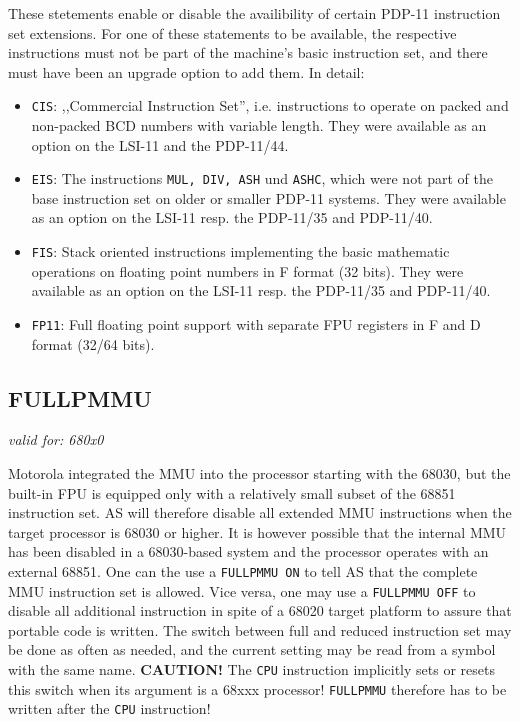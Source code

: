 \documentclass[12pt,twoside]{report}
\makeatletter
\newcommand{\bb}[1]{{\bf #1}}
\newcommand{\tty}[1]{{\tt #1}}
\newcommand{\ttindex}[1]{\index{#1@{\tt #1}}}
\newcommand{\asname}{{AS}}
\makeatother
\begin{document}
These stetements enable or disable the availibility of certain PDP-11
instruction set extensions.  For one of these statements to be available,
the respective instructions must not be part of the machine's basic
instruction set, and there must have been an upgrade option to add them.
In detail:

\begin{itemize}
\item{{\tt CIS}: ,,Commercial Instruction Set'', i.e. instructions to
      operate on packed and non-packed BCD numbers with variable length.
      They were available as an option on the LSI-11 and the PDP-11/44.}
\item{{\tt EIS}: The instructions {\tt MUL, DIV, ASH} und {\tt ASHC},
      which were not part of the base instruction set on older or
      smaller PDP-11 systems.  They were available as an option on the
      LSI-11 resp. the PDP-11/35 and PDP-11/40.}
\item{{\tt FIS}: Stack oriented instructions implementing the basic
      mathematic operations on floating point numbers in F format (32 bits).
      They were available as an option on the LSI-11 resp. the PDP-11/35
      and PDP-11/40.}
\item{{\tt FP11}: Full floating point support with separate FPU registers
      in F and D format (32/64 bits).}
\end{itemize}


\subsection{FULLPMMU}
\ttindex{FULLPMMU}

{\em valid for: 680x0}

Motorola integrated the MMU into the processor starting with the 68030, but
the built-in FPU is equipped only with a relatively small subset of the
68851 instruction set.  \asname{} will therefore disable all extended MMU
instructions when the target processor is 68030 or higher.  It is however
possible that the internal MMU has been disabled in a 68030-based system
and the processor operates with an external 68851.  One can the use a
\tty{FULLPMMU ON} to tell \asname{} that the complete MMU instruction set is
allowed.  Vice versa, one may use a \tty{FULLPMMU OFF} to disable all
additional instruction in spite of a 68020 target platform to assure that
portable code is written.  The switch between full and reduced instruction
set may be done as often as needed, and the current setting may be read
from a symbol with the same name.  \bb{CAUTION!} The \tty{CPU} instruction
implicitly sets or resets this switch when its argument is a 68xxx
processor!  \tty{FULLPMMU} therefore has to be written after the \tty{CPU}
instruction!
\end{document}
